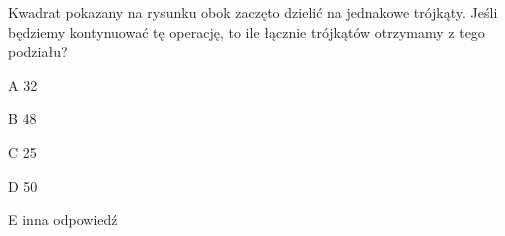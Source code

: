 \begin{tresc}
Kwadrat pokazany na rysunku obok zaczęto dzielić na jednakowe trójkąty. Jeśli będziemy kontynuować tę operację, to ile łącznie trójkątów otrzymamy z tego podziału?
\end{tresc}
\begin{wariant}{A} 32 \end{wariant}
\begin{wariant}{B} 48 \end{wariant}
\begin{wariant}{C} 25 \end{wariant}
\begin{wariant}{D} 50 \end{wariant}
\begin{wariant}{E} inna odpowiedź \end{wariant}
